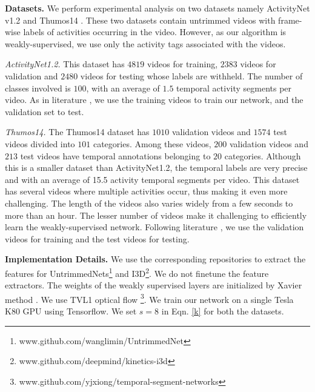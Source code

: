 \documentclass[runningheads]{llncs}
\begin{document}
\textbf{Datasets.} 
We perform experimental analysis on two datasets namely ActivityNet v1.2 \cite{heilbron2015activitynet} and Thumos14 \cite{idrees2017thumos}. These two datasets contain untrimmed videos with frame-wise labels of activities occurring in the video. However, as our algorithm is weakly-supervised, we use only the activity tags associated with the videos.

\textit{ActivityNet1.2.} This dataset has $4819$ videos for training, $2383$ videos for validation and $2480$ videos for testing whose labels are withheld. The number of classes involved is $100$, with an average of $1.5$ temporal activity segments per video. As in literature \cite{wang2017untrimmednets,nguyen2017weakly}, we use the training videos to train our network, and the validation set to test. 

\textit{Thumos14.} The Thumos14 dataset has $1010$ validation videos and $1574$ test videos divided into $101$ categories. Among these videos, $200$ validation videos and $213$ test videos have temporal annotations belonging to $20$ categories. Although this is a smaller dataset than ActivityNet1.2, the temporal labels are very precise and with an average of 15.5 activity temporal segments per video. This dataset has several videos where multiple activities occur, thus making it even more challenging. The length of the videos also varies widely from a few seconds to more than an hour. The lesser number of videos make it challenging to efficiently learn the weakly-supervised network. Following literature \cite{wang2017untrimmednets,nguyen2017weakly}, we use the validation videos for training and the test videos for testing.


\textbf{Implementation Details.} We use the corresponding repositories to extract the features for UntrimmedNets\footnote{www.github.com/wanglimin/UntrimmedNet} and I3D\footnote{www.github.com/deepmind/kinetics-i3d}. We do not finetune the feature extractors. The weights of the weakly supervised layers are initialized by Xavier method \cite{glorot2010understanding}. We use TVL1 optical flow  \footnote{www.github.com/yjxiong/temporal-segment-networks}. We train our network on a single Tesla K80 GPU using Tensorflow. We set $s=8$ in Eqn. \ref{k} for both the datasets.
\end{document}
